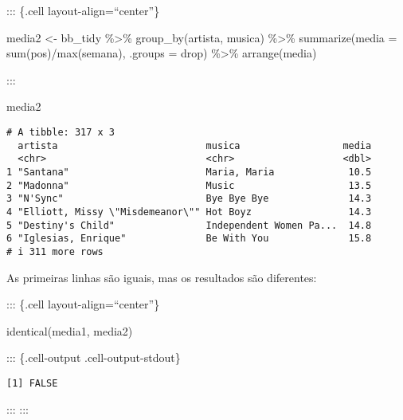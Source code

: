 \documentclass[
  letterpaper,
  DIV=11,
  numbers=noendperiod]{scrreprt}
\newenvironment{Shaded}{\begin{snugshade}}{\end{snugshade}}
\newcommand{\AttributeTok}[1]{\textcolor[rgb]{0.40,0.45,0.13}{#1}}
\newcommand{\FunctionTok}[1]{\textcolor[rgb]{0.28,0.35,0.67}{#1}}
\newcommand{\NormalTok}[1]{\textcolor[rgb]{0.00,0.23,0.31}{#1}}
\newcommand{\OtherTok}[1]{\textcolor[rgb]{0.00,0.23,0.31}{#1}}
\newcommand{\SpecialCharTok}[1]{\textcolor[rgb]{0.37,0.37,0.37}{#1}}
\newcommand{\StringTok}[1]{\textcolor[rgb]{0.13,0.47,0.30}{#1}}
\begin{document}
\begin{itemize}
  ::: \{.cell layout-align=``center''\}

\begin{Shaded}
\begin{Highlighting}[]
\NormalTok{media2 }\OtherTok{\textless{}{-}}\NormalTok{ bb\_tidy }\SpecialCharTok{\%\textgreater{}\%} 
  \FunctionTok{group\_by}\NormalTok{(artista, musica) }\SpecialCharTok{\%\textgreater{}\%} 
  \FunctionTok{summarize}\NormalTok{(}\AttributeTok{media =} \FunctionTok{sum}\NormalTok{(pos)}\SpecialCharTok{/}\FunctionTok{max}\NormalTok{(semana), }\AttributeTok{.groups =} \StringTok{\textquotesingle{}drop\textquotesingle{}}\NormalTok{) }\SpecialCharTok{\%\textgreater{}\%} 
  \FunctionTok{arrange}\NormalTok{(media)}
\end{Highlighting}
\end{Shaded}

  :::

\begin{Shaded}
\begin{Highlighting}[]
\NormalTok{media2}
\end{Highlighting}
\end{Shaded}

\begin{verbatim}
# A tibble: 317 x 3
  artista                          musica                  media
  <chr>                            <chr>                   <dbl>
1 "Santana"                        Maria, Maria             10.5
2 "Madonna"                        Music                    13.5
3 "N'Sync"                         Bye Bye Bye              14.3
4 "Elliott, Missy \"Misdemeanor\"" Hot Boyz                 14.3
5 "Destiny's Child"                Independent Women Pa...  14.8
6 "Iglesias, Enrique"              Be With You              15.8
# i 311 more rows
\end{verbatim}

  As primeiras linhas são iguais, mas os resultados são diferentes:

  ::: \{.cell layout-align=``center''\}

\begin{Shaded}
\begin{Highlighting}[]
\FunctionTok{identical}\NormalTok{(media1, media2)}
\end{Highlighting}
\end{Shaded}

  ::: \{.cell-output .cell-output-stdout\}

\begin{verbatim}
[1] FALSE
\end{verbatim}

  ::: :::
\end{itemize}
\end{document}
